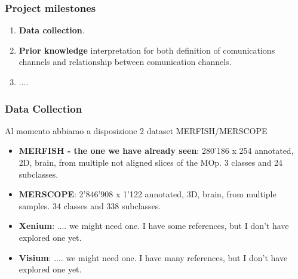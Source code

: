 \begin{frame}
    \frametitle{Project milestones}
    \begin{enumerate}
        \item \textbf{Data collection}.
        \item \textbf{Prior knowledge} interpretation for both definition of comunications channels and relationship between comunication channels.
        \item ....
    \end{enumerate}
\end{frame}

\begin{frame}
    \frametitle{Data Collection}
    Al momento abbiamo a disposizione 2 dataset MERFISH/MERSCOPE
    \begin{itemize}
        \item \textbf{MERFISH - the one we have already seen}: 280'186 x 254 annotated, 2D, brain, from multiple not aligned slices of the MOp. 3 classes and 24 subclasses.
        \item \textbf{MERSCOPE}: 2'846'908 x 1'122 annotated, 3D, brain, from multiple samples. 34 classes and 338 subclasses.
        \item \textbf{Xenium}: .... we might need one. I have some references, but I don't have explored one yet.
        \item \textbf{Visium}: .... we might need one. I have many references, but I don't have explored one yet.
    \end{itemize}
\end{frame}

